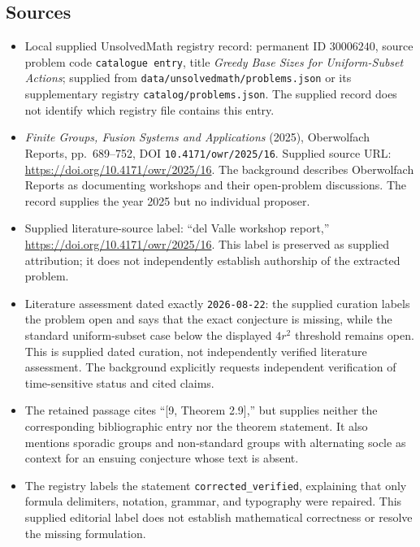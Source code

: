 \documentclass[11pt]{article}
\begin{document}
\subsection{Sources}
\begin{itemize}
\item Local supplied UnsolvedMath registry record: permanent ID \(30006240\), source problem code \texttt{catalogue entry}, title \emph{Greedy Base Sizes for Uniform-Subset Actions}; supplied from \texttt{data/unsolvedmath/problems.json} or its supplementary registry \texttt{catalog/problems.json}. The supplied record does not identify which registry file contains this entry.
\item \emph{Finite Groups, Fusion Systems and Applications} (2025), Oberwolfach Reports, pp.\ 689--752, DOI \texttt{10.4171/owr/2025/16}. Supplied source URL: \url{https://doi.org/10.4171/owr/2025/16}. The background describes Oberwolfach Reports as documenting workshops and their open-problem discussions. The record supplies the year 2025 but no individual proposer.
\item Supplied literature-source label: ``del Valle workshop report,'' \url{https://doi.org/10.4171/owr/2025/16}. This label is preserved as supplied attribution; it does not independently establish authorship of the extracted problem.
\item Literature assessment dated exactly \texttt{2026-08-22}: the supplied curation labels the problem open and says that the exact conjecture is missing, while the standard uniform-subset case below the displayed \(4r^2\) threshold remains open. This is supplied dated curation, not independently verified literature assessment. The background explicitly requests independent verification of time-sensitive status and cited claims.
\item The retained passage cites ``[9, Theorem 2.9],'' but supplies neither the corresponding bibliographic entry nor the theorem statement. It also mentions sporadic groups and non-standard groups with alternating socle as context for an ensuing conjecture whose text is absent.
\item The registry labels the statement \texttt{corrected\_verified}, explaining that only formula delimiters, notation, grammar, and typography were repaired. This supplied editorial label does not establish mathematical correctness or resolve the missing formulation.
\end{itemize}
\end{document}
